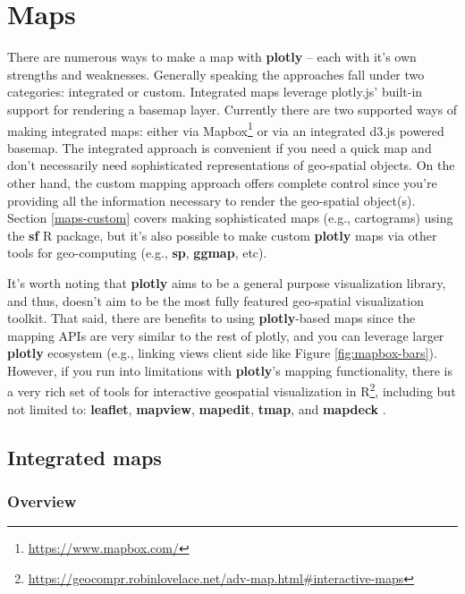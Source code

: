 \documentclass[
  12pt,
]{krantz}
\renewcommand{\href}[2]{#2\footnote{\url{#1}}}
\begin{document}
\hypertarget{maps}{%
\chapter{Maps}\label{maps}}

There are numerous ways to make a map with \textbf{plotly} -- each with it's own strengths and weaknesses. Generally speaking the approaches fall under two categories: integrated or custom. Integrated maps leverage plotly.js' built-in support for rendering a basemap layer. Currently there are two supported ways of making integrated maps: either via \href{https://www.mapbox.com/}{Mapbox} or via an integrated d3.js powered basemap. The integrated approach is convenient if you need a quick map and don't necessarily need sophisticated representations of geo-spatial objects. On the other hand, the custom mapping approach offers complete control since you're providing all the information necessary to render the geo-spatial object(s). Section \ref{maps-custom} covers making sophisticated maps (e.g., cartograms) using the \textbf{sf} R package, but it's also possible to make custom \textbf{plotly} maps via other tools for geo-computing (e.g., \textbf{sp}, \textbf{ggmap}, etc).

It's worth noting that \textbf{plotly} aims to be a general purpose visualization library, and thus, doesn't aim to be the most fully featured geo-spatial visualization toolkit. That said, there are benefits to using \textbf{plotly}-based maps since the mapping APIs are very similar to the rest of plotly, and you can leverage larger \textbf{plotly} ecosystem (e.g., linking views client side like Figure \ref{fig:mapbox-bars}). However, if you run into limitations with \textbf{plotly}'s mapping functionality, there is a very rich set of tools for \href{https://geocompr.robinlovelace.net/adv-map.html\#interactive-maps}{interactive geospatial visualization in R}, including but not limited to: \textbf{leaflet}, \textbf{mapview}, \textbf{mapedit}, \textbf{tmap}, and \textbf{mapdeck} \citep{geocomputation}.

\hypertarget{maps-integrated}{%
\section{Integrated maps}\label{maps-integrated}}

\hypertarget{overview-1}{%
\subsection{Overview}\label{overview-1}}
\end{document}
